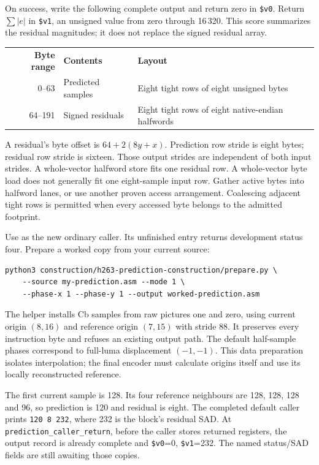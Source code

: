 On success, write the following complete output and return zero in
\texttt{\$v0}. Return $\sum |e|$ in \texttt{\$v1}, an unsigned value from zero
through 16\,320. This score summarizes the residual magnitudes; it does not
replace the signed residual array.
\begin{center}
  \begin{tabular}{rll}
    \textbf{Byte range} & \textbf{Contents} & \textbf{Layout}                                   \\
    0--63               & Predicted samples & Eight tight rows of eight unsigned bytes          \\
    64--191             & Signed residuals  & Eight tight rows of eight native-endian halfwords
  \end{tabular}
\end{center}
A residual's byte offset is $64+2(8y+x)$. Prediction row stride is eight bytes;
residual row stride is sixteen. Those output strides are independent of both
input strides. A whole-vector halfword store fits one residual row. A whole-vector
byte load does not generally fit one eight-sample input row. Gather active bytes
into halfword lanes, or use another proven access arrangement. Coalescing adjacent
tight rows is permitted when every accessed byte belongs to the admitted footprint.

Use  as the new ordinary caller.
Its unfinished entry returns development status four. Prepare a worked copy from
your current source:
\begin{verbatim}
python3 construction/h263-prediction-construction/prepare.py \
    --source my-prediction.asm --mode 1 \
    --phase-x 1 --phase-y 1 --output worked-prediction.asm
\end{verbatim}
The helper installs Cb samples from raw pictures one and zero, using current
origin $(8,16)$ and reference origin $(7,15)$ with stride 88. It preserves every
instruction byte and refuses an existing output path. The default half-sample
phases correspond to full-luma displacement $(-1,-1)$. This data preparation
isolates interpolation; the final encoder must calculate origins itself and
use its locally reconstructed reference.

The first current sample is 128. Its four reference neighbours are 128, 128,
128 and 96, so prediction is 120 and residual is eight. The completed default
caller prints \texttt{120 8 232}, where 232 is the block's residual SAD.
At \texttt{prediction\_caller\_return}, before the caller stores returned
registers, the output record is already complete and \texttt{\$v0}=0,
\texttt{\$v1}=232. The named status/SAD fields are still awaiting those copies.
